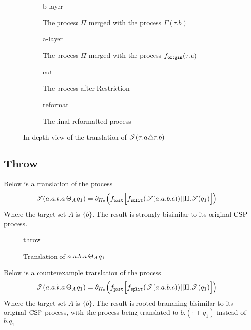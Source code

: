 \documentclass[../hons_project.tex]{subfiles}
\begin{document}
\begin{figure}[!ht]
	\centering
	\begin{subfigure}[b]{0.55\textwidth}
		{b-layer}
		\caption{The process $\Pi$ merged with the process $\Gamma(\tau.b)$}
	\end{subfigure}
	\hfill
	\begin{subfigure}[b]{0.43\textwidth}
		{a-layer}
		\caption{The process $\Pi$ merged with the process $f_{\mathtt{origin}}(\tau.a)$}
	\end{subfigure}\hfill

	\begin{subfigure}[b]{0.65\textwidth}
		{cut}
		\caption{The process after Restriction}
	\end{subfigure}\hfill
	\begin{subfigure}[b]{0.3\textwidth}
		{reformat}
		\caption{The final reformatted process}
	\end{subfigure}
	\caption{In-depth view of the translation of $\mathscr{T}(\tau.a \triangle \tau.b)$}
\end{figure}





\newpage
\subsection{Throw}

Below is a translation of the process
		\[\mathscr{T}(a.a.b.a \,\Theta_{A}\, q_{1})     = \partial_{H_{0}}\Bigl(f_{\mathtt{post}} \Bigl[ f_{\mathtt{split}}(\mathscr{T}(a.a.b.a)) | | \Pi.\mathscr{T}(q_{1}) \Bigr]\Bigr)\]
Where the target set $A$ is $\{b\}$. The result is strongly bisimilar to its original $\mathrm{CSP}$ process.
\begin{figure}[H]
	\centering
	{throw}
	\caption{Translation of $a.a.b.a \,\Theta_{A}\, q_{1}$}
\end{figure}

Below is a counterexample translation of the process
		\[\mathscr{T}(a.a.b.a \,\Theta_{A}\, q_{1})     = \partial_{H_{0}}\Bigl(f_{\mathtt{post}} \Bigl[ f_{\mathtt{split}}(\mathscr{T}(a.a.b.a)) | | \Pi.\mathscr{T}(q_{1}) \Bigr]\Bigr)\]
Where the target set $A$ is $\{b\}$. The result is rooted branching bisimilar to its original $\mathrm{CSP}$ process, with the process being translated to $b.(\tau + q_{1})$ instead of $b.q_{1}$
\end{document}
